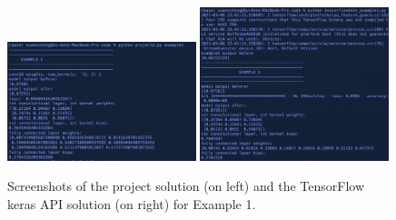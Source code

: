\documentclass[12pt]{amsart}
\begin{document}
\begin{figure}[h]
\includegraphics[height=0.33\textheight, width=0.49\textwidth]{ex1_proj.png}
\includegraphics[height=0.33\textheight, width=0.49\textwidth]{ex1_tf.png}
\caption{Screenshots of the project solution (on left) and the TensorFlow keras API solution (on right) for Example 1.}
\end{figure}

\end{document}
